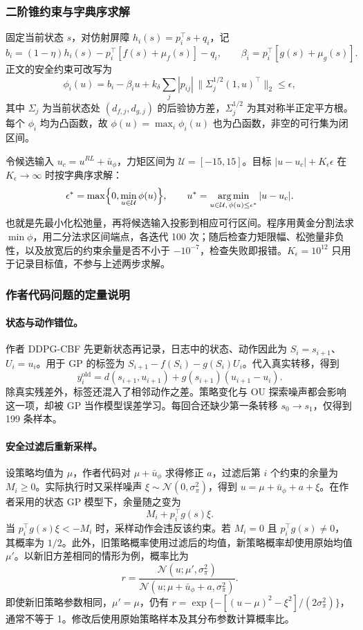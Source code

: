 \documentclass[UTF8,a4paper,zihao=-4,fontset=fandol]{ctexart}
\begin{document}
\subsubsection{二阶锥约束与字典序求解}
固定当前状态 $s$，对仿射屏障 $h_i(s)=p_i^\top s+q_i$，记
\[
b_i=(1-\eta)h_i(s)-p_i^\top[f(s)+\mu_f(s)]-q_i,\qquad
\beta_i=p_i^\top[g(s)+\mu_g(s)].
\]
正文的安全约束可改写为
\begin{equation}
\phi_i(u)=b_i-\beta_iu+k_\delta\sum_j|p_{ij}|\,
\bigl\|\Sigma_j^{1/2}(1,u)^\top\bigr\|_2\le\epsilon,
\end{equation}
其中 $\Sigma_j$ 为当前状态处 $(d_{f,j},d_{g,j})$ 的后验协方差，$\Sigma_j^{1/2}$ 为其对称半正定平方根。每个 $\phi_i$ 均为凸函数，故 $\phi(u)=\max_i\phi_i(u)$ 也为凸函数，非空的可行集为闭区间。

令候选输入 $u_c=u^{RL}+\bar u_\phi$，力矩区间为 $\mathcal U=[-15,15]$。目标 $|u-u_c|+K_\epsilon\epsilon$ 在 $K_\epsilon\to\infty$ 时按字典序求解：
\[
\epsilon^*=\max\Bigl\{0,\min_{u\in\mathcal U}\phi(u)\Bigr\},\qquad
u^*=\underset{u\in\mathcal U,\,\phi(u)\le\epsilon^*}{\arg\min}\,|u-u_c|.
\]
也就是先最小化松弛量，再将候选输入投影到相应可行区间。程序用黄金分割法求 $\min\phi$，用二分法求区间端点，各迭代 100 次；随后检查力矩限幅、松弛量非负性，以及放宽后的约束余量是否不小于 $-10^{-7}$，检查失败即报错。$K_\epsilon=10^{12}$ 只用于记录目标值，不参与上述两步求解。

\subsubsection{作者代码问题的定量说明}
\paragraph{状态与动作错位。}
作者 DDPG-CBF 先更新状态再记录，日志中的状态、动作因此为 $S_i=s_{i+1}$、$U_i=u_i$。用于 GP 的标签为 $S_{i+1}-f(S_i)-g(S_i)U_i$。代入真实转移，得到
\begin{equation}
y_i^{\mathrm{old}}=d(s_{i+1},u_{i+1})+g(s_{i+1})(u_{i+1}-u_i).
\end{equation}
除真实残差外，标签还混入了相邻动作之差。策略变化与 OU 探索噪声都会影响这一项，却被 GP 当作模型误差学习。每回合还缺少第一条转移 $s_0\to s_1$，仅得到 199 条样本。

\paragraph{安全过滤后重新采样。}
设策略均值为 $\mu$，作者代码对 $\mu+\bar u_\phi$ 求得修正 $a$，过滤后第 $i$ 个约束的余量为 $M_i\ge0$。实际执行时又采样噪声 $\xi\sim\mathcal N(0,\sigma_\pi^2)$，得到 $u=\mu+\bar u_\phi+a+\xi$。在作者采用的状态 GP 模型下，余量随之变为
\[
M_i+p_i^\top g(s)\xi.
\]
当 $p_i^\top g(s)\xi<-M_i$ 时，采样动作会违反该约束。若 $M_i=0$ 且 $p_i^\top g(s)\ne0$，其概率为 $1/2$。此外，旧策略概率使用过滤后的均值，新策略概率却使用原始均值 $\mu'$。以新旧方差相同的情形为例，概率比为
\[
r=\frac{\mathcal N(u;\mu',\sigma_\pi^2)}{\mathcal N(u;\mu+\bar u_\phi+a,\sigma_\pi^2)}.
\]
即使新旧策略参数相同，$\mu'=\mu$，仍有 $r=\exp\{-[(u-\mu)^2-\xi^2]/(2\sigma_\pi^2)\}$，通常不等于 1。修改后使用原始策略样本及其分布参数计算概率比。
\end{document}

